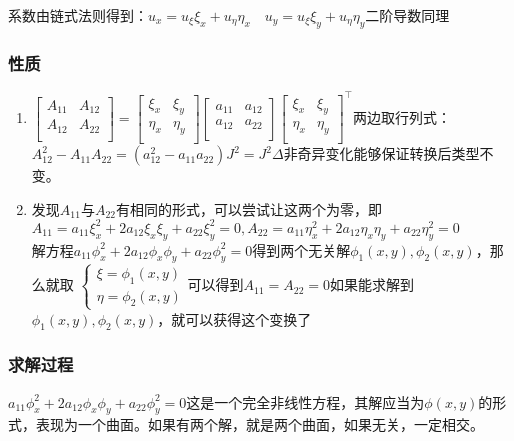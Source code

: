 系数由链式法则得到：\(u_x=u_\xi\xi_x+u_\eta\eta_x\quad u_y=u_\xi\xi_y+u_\eta\eta_y\)二阶导数同理

\subsubsection{性质}
\begin{enumerate}
	\item \(\left[\begin{matrix}A_{11}&A_{12}\\A_{12}&A_{22}\\\end{matrix}\right]=\left[\begin{matrix}\xi_x&\xi_y\\\eta_x&\eta_y\\\end{matrix}\right]\left[\begin{matrix}a_{11}&a_{12}\\a_{12}&a_{22}\\\end{matrix}\right]\left[\begin{matrix}\xi_x&\xi_y\\\eta_x&\eta_y\\\end{matrix}\right]^\top\)两边取行列式：\(A_{12}^2-A_{11}A_{22}=\left(a_{12}^2-a_{11}a_{22}\right)J^2=J^2\Delta\)非奇异变化能够保证转换后类型不变。
	\item 发现\(A_{11}\)与\(A_{22}\)有相同的形式，可以尝试让这两个为零，即\(A_{11}=a_{11}\xi_x^2+2a_{12}\xi_x\xi_y+a_{22}\xi_y^2=0,A_{22}=a_{11}\eta_x^2+2a_{12}\eta_x\eta_y+a_{22}\eta_y^2=0\)\\
	解方程\(a_{11}\phi_x^2+2a_{12}\phi_x\phi_y+a_{22}\phi_y^2=0\)得到两个无关解\(\phi_1(x,y),\phi_2(x,y)\)，那么就取 \(\begin{cases}\xi=\phi_1(x,y)\\\eta=\phi_2(x,y)\end{cases}\)可以得到\(A_{11}=A_{22}=0\)如果能求解到\(\phi_1(x,y),\phi_2(x,y)\)，就可以获得这个变换了
\end{enumerate}
\subsubsection{求解过程}

\(a_{11}\phi_x^2+2a_{12}\phi_x\phi_y+a_{22}\phi_y^2=0\)这是一个完全非线性方程，其解应当为\(\phi(x,y)\)的形式，表现为一个曲面。如果有两个解，就是两个曲面，如果无关，一定相交。


